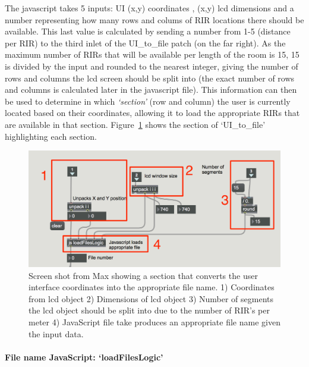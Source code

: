 \documentclass[../../main.tex]{subfiles}
\begin{document}
			The javascript takes 5 inputs: UI (x,y) coordinates , (x,y) lcd dimensions and a number representing how many rows and colums of \ac{RIR} locations there should be available. This last value is calculated by sending a number from 1-5 (distance per RIR) to the third inlet of the UI\_to\_file patch (on the far right). As the maximum number of RIRs that will be available per length of the room is 15, 15 is divided by the input and rounded to the nearest integer, giving the number of rows and columns the lcd screen should be split into (the exact number of rows and columns is calculated later in the javascript file). This information can then be used to determine in which \textit{‘section’} (row and column) the user is currently located based on their coordinates, allowing it to load the appropriate RIRs that are available in that section. Figure~\ref{locationsConvert} shows the section of `UI\_to\_file' highlighting each section.

			\begin{figure}[H]
				\centerline{\includegraphics[scale = 0.6]{Sections/Implementation/Max/images/Max/UI_to_file_edit_4.png}}
				\caption{Screen shot from Max showing a section that converts the user interface coordinates into the appropriate file name. 1) Coordinates from lcd object 2) Dimensions of lcd object 3) Number of segments the lcd object should be split into due to the number of \ac{RIR}'s per meter 4) JavaScript file take produces an appropriate file name given the input data.}
				\label{locationsConvert}
			\end{figure}

			\paragraph{File name JavaScript: `loadFilesLogic'}
\end{document}
